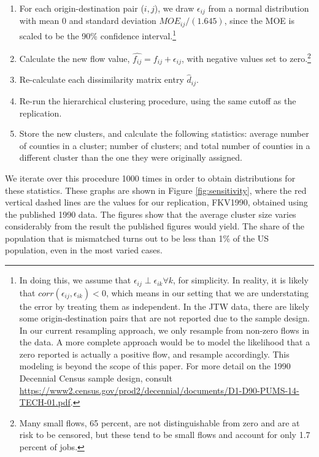 \begin{enumerate}
	\item For each origin-destination pair ($i,j$), we draw $\epsilon_{ij}$ from a normal distribution with mean 0 and standard deviation $MOE_{ij}/(1.645)$, since the MOE is scaled to be the 90\% confidence interval.\footnote{In doing this, we assume that $\epsilon_{ij} \perp \epsilon_{ik} \forall k$, for simplicity. In reality, it is likely that $corr(\epsilon_{ij},\epsilon_{ik})<0$, which means in our setting that we are understating the error by treating them as independent. In the JTW data, there are likely some origin-destination pairs that are not reported due to the sample design. In our current resampling approach, we only resample from non-zero flows in the data. A more complete approach would be to model the likelihood that a zero reported is actually a positive flow, and resample accordingly. This modeling is beyond the scope of this paper. For more detail on the 1990 Decennial Census sample design, consult \url{https://www2.census.gov/prod2/decennial/documents/D1-D90-PUMS-14-TECH-01.pdf}.}
	\item Calculate the new flow value, $\hat{f_{ij}} = f_{ij} + \epsilon_{ij}$, with negative values set to zero.\footnote{Many small flows, 65 percent, are not distinguishable from zero and are at risk to be censored, but these tend to be small flows and account for only 1.7 percent of jobs.}
	\item Re-calculate each dissimilarity matrix entry $\hat{d}_{ij}$. 
	\item Re-run the hierarchical clustering procedure, using the same cutoff as the replication.
	\item Store the new clusters, and calculate the following statistics: average number of counties in a cluster; number of clusters; and total number of counties in a different cluster than the one they were originally assigned.
\end{enumerate}

We iterate over this procedure 1000 times in order to obtain distributions for these statistics. These graphs are shown in Figure \ref{fig:sensitivity}, where the red vertical dashed lines are the values for our replication, FKV1990, obtained using the published 1990 data. The figures show that the average cluster size varies considerably from the result the published figures would yield. The share of the population that is mismatched turns out to be less than 1\% of the US population, even in the most varied cases.

